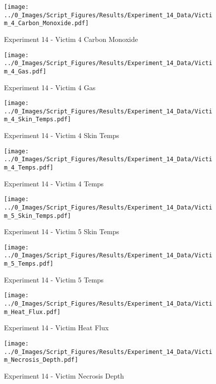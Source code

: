 	\clearpage

	\begin{figure}[H]
		\centering
		\texttt{[image: ../0\_Images/Script\_Figures/Results/Experiment\_14\_Data/Victim\_4\_Carbon\_Monoxide.pdf]}
		\caption[]{Experiment 14 - Victim 4 Carbon Monoxide}
	\end{figure}
 

	\begin{figure}[H]
		\centering
		\texttt{[image: ../0\_Images/Script\_Figures/Results/Experiment\_14\_Data/Victim\_4\_Gas.pdf]}
		\caption[]{Experiment 14 - Victim 4 Gas}
	\end{figure}
 
	\clearpage

	\begin{figure}[H]
		\centering
		\texttt{[image: ../0\_Images/Script\_Figures/Results/Experiment\_14\_Data/Victim\_4\_Skin\_Temps.pdf]}
		\caption[]{Experiment 14 - Victim 4 Skin Temps}
	\end{figure}
 

	\begin{figure}[H]
		\centering
		\texttt{[image: ../0\_Images/Script\_Figures/Results/Experiment\_14\_Data/Victim\_4\_Temps.pdf]}
		\caption[]{Experiment 14 - Victim 4 Temps}
	\end{figure}
 
	\clearpage

	\begin{figure}[H]
		\centering
		\texttt{[image: ../0\_Images/Script\_Figures/Results/Experiment\_14\_Data/Victim\_5\_Skin\_Temps.pdf]}
		\caption[]{Experiment 14 - Victim 5 Skin Temps}
	\end{figure}
 

	\begin{figure}[H]
		\centering
		\texttt{[image: ../0\_Images/Script\_Figures/Results/Experiment\_14\_Data/Victim\_5\_Temps.pdf]}
		\caption[]{Experiment 14 - Victim 5 Temps}
	\end{figure}
 
	\clearpage

	\begin{figure}[H]
		\centering
		\texttt{[image: ../0\_Images/Script\_Figures/Results/Experiment\_14\_Data/Victim\_Heat\_Flux.pdf]}
		\caption[]{Experiment 14 - Victim Heat Flux}
	\end{figure}
 

	\begin{figure}[H]
		\centering
		\texttt{[image: ../0\_Images/Script\_Figures/Results/Experiment\_14\_Data/Victim\_Necrosis\_Depth.pdf]}
		\caption[]{Experiment 14 - Victim Necrosis Depth}
	\end{figure}
 
